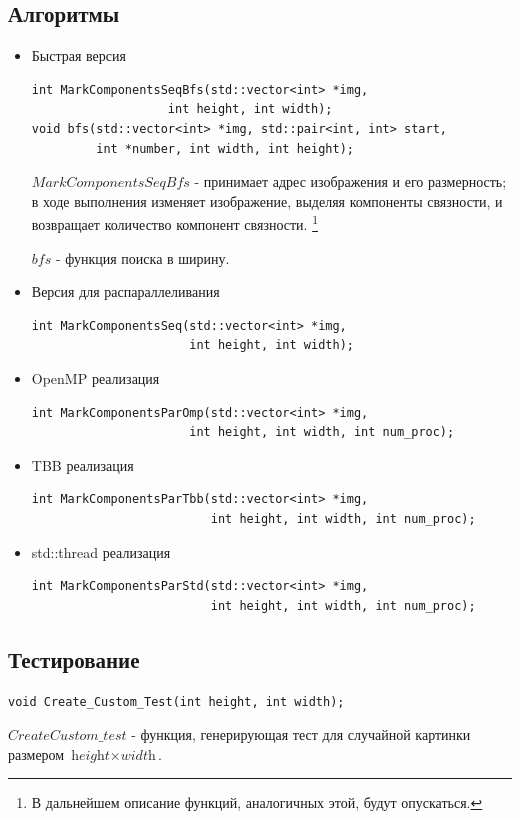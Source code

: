 \documentclass{report}
\begin{document}
\subsection*{Алгоритмы}
\begin{itemize}
    \item Быстрая версия
\begin{lstlisting}
int MarkComponentsSeqBfs(std::vector<int> *img,
                   int height, int width);
void bfs(std::vector<int> *img, std::pair<int, int> start,
         int *number, int width, int height);
\end{lstlisting}
\par \textit{$MarkComponentsSeqBfs$} - принимает адрес изображения и его размерность; в ходе выполнения изменяет изображение, выделяя компоненты связности, и возвращает количество компонент связности.
\footnote{В дальнейшем описание функций, аналогичных этой, будут опускаться.}

\textit{$bfs$} - функция поиска в ширину.

\item Версия для распараллеливания
\begin{lstlisting}
int MarkComponentsSeq(std::vector<int> *img,
                      int height, int width);
\end{lstlisting}

\item OpenMP реализация
\begin{lstlisting}
int MarkComponentsParOmp(std::vector<int> *img,
                      int height, int width, int num_proc);
\end{lstlisting}

\item TBB реализация
\begin{lstlisting}
int MarkComponentsParTbb(std::vector<int> *img,
                         int height, int width, int num_proc);
\end{lstlisting}

\item std::thread реализация
\begin{lstlisting}
int MarkComponentsParStd(std::vector<int> *img,
                         int height, int width, int num_proc);
\end{lstlisting}



\end{itemize}

\subsection*{Тестирование}
\begin{lstlisting}
void Create_Custom_Test(int height, int width);
\end{lstlisting}
\par \textit{$CreateCustom\_test$} - функция, генерирующая тест для случайной картинки размером \begin{math} \textit{height} \times \textit{width} \end{math}.
 
\end{document}
